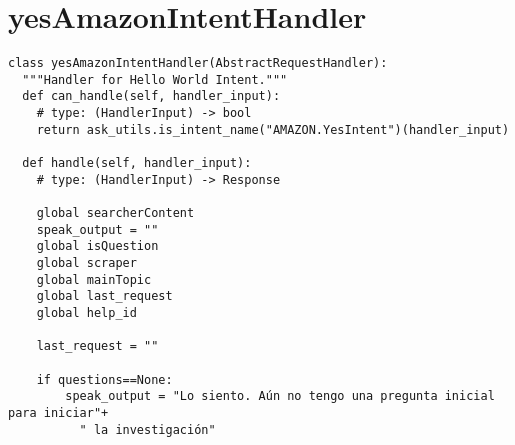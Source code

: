 
\section{yesAmazonIntentHandler}
\label{A7Anexo}

\begin{tcolorbox}[colback=white!25!white,colframe=blue]
  \begin{verbatim}
class yesAmazonIntentHandler(AbstractRequestHandler):
  """Handler for Hello World Intent."""
  def can_handle(self, handler_input):
    # type: (HandlerInput) -> bool
    return ask_utils.is_intent_name("AMAZON.YesIntent")(handler_input)

  def handle(self, handler_input):
    # type: (HandlerInput) -> Response
    
    global searcherContent
    speak_output = ""
    global isQuestion
    global scraper
    global mainTopic
    global last_request
    global help_id
    
    last_request = ""
    
    if questions==None:
        speak_output = "Lo siento. Aún no tengo una pregunta inicial para iniciar"+
          " la investigación"
  \end{verbatim}
\end{tcolorbox}

